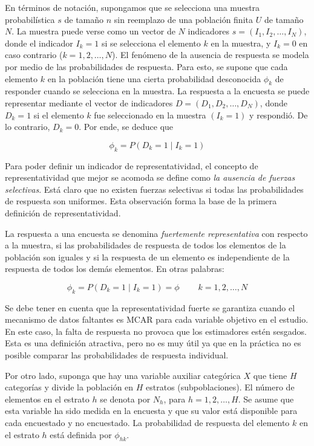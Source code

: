 \documentclass[
  12pt,
]{book}
\begin{document}
En términos de notación, supongamos que se selecciona una muestra probabilística \(s\) de tamaño \(n\) sin reemplazo de una población finita \(U\) de tamaño \(N\). La muestra puede verse como un vector de \(N\) indicadores \(s=(I_{1},I_{2},\ldots,I_{N})\), donde el indicador \(I_{k}=1\) si se selecciona el elemento \(k\) en la muestra, y \(I_{k}=0\) en caso contrario (\(k=1,2,\ldots,N\)). El fenómeno de la ausencia de respuesta se modela por medio de las probabilidades de respuesta. Para esto, se supone que cada elemento \(k\) en la población tiene una cierta probabilidad desconocida \(\phi_{k}\) de responder cuando se selecciona en la muestra. La respuesta a la encuesta se puede representar mediante el vector de indicadores \(D=(D_{1},D_{2},\ldots,D_{N})\), donde \(D_{k}=1\) si el elemento \(k\) fue seleccionado en la muestra \((I_{k}=1)\) y respondió. De lo contrario, \(D_{k}=0\). Por ende, se deduce que

\[
\phi_{k}=P\left(D_{k}=1\mid I_{k}=1\right)
\]

Para poder definir un indicador de representatividad, el concepto
de representatividad que mejor se acomoda se define como \emph{la ausencia de fuerzas selectivas}. Está claro que no existen fuerzas selectivas si todas las probabilidades de respuesta son uniformes. Esta observación forma la base de la primera definición de representatividad.

La respuesta a una encuesta se denomina \emph{fuertemente representativa} con
respecto a la muestra, si las probabilidades de respuesta de todos
los elementos de la población son iguales y si la respuesta de un
elemento es independiente de la respuesta de todos los demás elementos.
En otras palabras:

\[
\phi_{k} = P\left(D_{k}=1\mid I_{k}=1\right) =  \phi  \ \ \ \ \ \ \ \ \ \ k=1,2,\ldots,N
\]

Se debe tener en cuenta que la representatividad fuerte se garantiza cuando el mecanismo de datos faltantes es MCAR para cada variable objetivo en el estudio. En este caso, la falta de respuesta no provoca que los estimadores estén sesgados. Esta es una definición atractiva, pero no es muy útil ya que en la práctica no es posible comparar las probabilidades de respuesta individual.

Por otro lado, suponga que hay una variable auxiliar categórica \(X\) que tiene \(H\)
categorías y divide la población en \(H\) estratos (subpoblaciones).
El número de elementos en el estrato \(h\) se denota por \(N_{h}\),
para \(h=1,2,\ldots,H\). Se asume que esta variable ha sido medida
en la encuesta y que su valor está disponible para cada encuestado
y no encuestado. La probabilidad de respuesta del elemento \(k\) en
el estrato \(h\) está definida por \(\phi_{hk}\).
\end{document}
